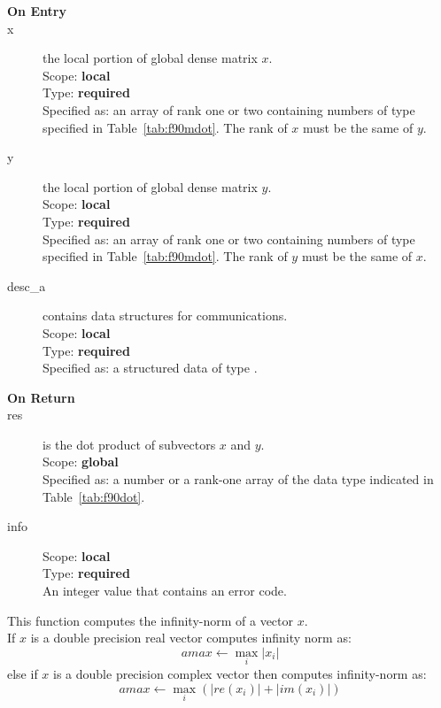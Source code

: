 \begin{description}
\item[\bf On Entry]
\item[x] the local portion of global dense matrix
$x$. \\
Scope: {\bf local} \\
Type: {\bf required} \\
Specified as: an array of rank one or two
containing numbers of type specified in
Table~\ref{tab:f90mdot}. The rank of $x$ must be the same of $y$. 
\item[y] the local portion of global dense matrix
$y$. \\
Scope: {\bf local} \\
Type: {\bf required} \\
Specified as: an array of rank one or two
containing numbers of type specified in
Table~\ref{tab:f90mdot}. The rank of $y$ must be the same of $x$. 
\item[desc\_a] contains data structures for communications.\\
Scope: {\bf local} \\
Type: {\bf required}\\
Specified as: a structured data of type \descdata.
\item[\bf On Return] 
\item[res] is the dot product of subvectors $x$ and $y$.\\
Scope: {\bf global} \\
Specified as: a number or a rank-one array  of the data type indicated
in Table~\ref{tab:f90dot}. 
\item[info] 
Scope: {\bf local} \\
Type: {\bf required} \\
An integer value that contains an error code. 
\end{description}

%
%



This function computes 
 the infinity-norm of a vector $x$.\\
If $x$ is a double precision real  vector
computes infinity norm as:
\[ amax \leftarrow \max_i |x_i|\]
else if $x$ is a double precision complex vector then computes infinity-norm  as:
\[ amax \leftarrow \max_i {(|re(x_i)| + |im(x_i)|)}\]

